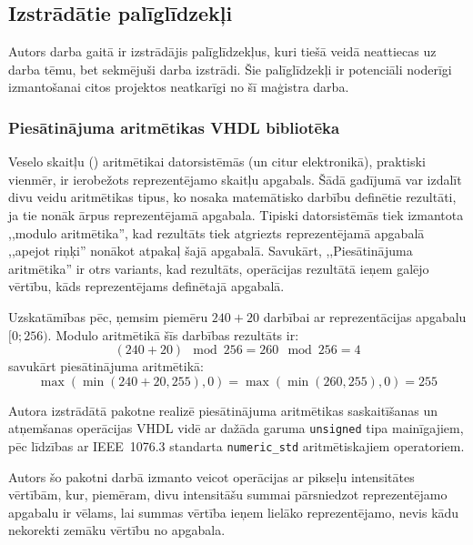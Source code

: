 \subsection{Izstrādātie palīglīdzekļi}\label{appx:tools}
\setcounter{lstlisting}{0} %

Autors darba gaitā ir izstrādājis palīglīdzekļus, kuri
tiešā veidā neattiecas uz darba tēmu, bet sekmējuši darba izstrādi.
Šie palīglīdzekļi ir potenciāli noderīgi izmantošanai citos projektos
neatkarīgi no šī maģistra darba.

\subsubsection*{Piesātinājuma aritmētikas VHDL bibliotēka}
Veselo skaitļu () aritmētikai datorsistēmās
(un citur elektronikā), praktiski vienmēr, ir ierobežots
reprezentējamo skaitļu apgabals. Šādā gadījumā var izdalīt divu veidu
aritmētikas tipus, ko nosaka matemātisko darbību definētie rezultāti, ja
tie nonāk ārpus reprezentējamā apgabala.
Tipiski datorsistēmās tiek izmantota ,,modulo aritmētika'', kad rezultāts
tiek atgriezts reprezentējamā apgabalā ,,apejot riņķi'' nonākot atpakaļ
šajā apgabalā.
Savukārt, ,,Piesātinājuma aritmētika'' ir otrs variants, kad rezultāts, operācijas
rezultātā ieņem galējo vērtību, kāds reprezentējams definētajā apgabalā.

Uzskatāmības pēc, ņemsim piemēru $240+20$ darbībai ar reprezentācijas
apgabalu $[0 ; 256)$. Modulo aritmētikā šīs darbības rezultāts ir:
\[
	(240 + 20) \mod 256 = 260 \mod 256 = 4
\]
savukārt piesātinājuma aritmētikā:
\[
	\max\left( {\min (240+20, 255)}, 0 \right) =
		\max\left({\min(260, 255)}, 0\right) = 255
\]

\begin{singlespace}
VHDL},%
	                 caption={Piesātinājuma aritmētikas VHDL pakotne.},%
	                 breaklines,breakatwhitespace,%
	                 mathescape=true,%
	                 tabsize=2,%
	                 label=kb:satarith]
		{code/saturation/saturation_arith.vhdl}
\end{singlespace}

Autora izstrādātā pakotne realizē piesātinājuma aritmētikas saskaitīšanas un
atņemšanas operācijas VHDL vidē ar dažāda garuma \texttt{unsigned} tipa
mainīgajiem, pēc līdzības ar IEEE~1076.3 standarta \texttt{numeric\_std}
aritmētiskajiem operatoriem.

Autors šo pakotni darbā izmanto veicot operācijas ar pikseļu intensitātes
vērtībām, kur, piemēram, divu intensitāšu summai pārsniedzot
reprezentējamo apgabalu ir vēlams, lai summas vērtība ieņem lielāko
reprezentējamo, nevis kādu nekorekti zemāku vērtību no apgabala.


